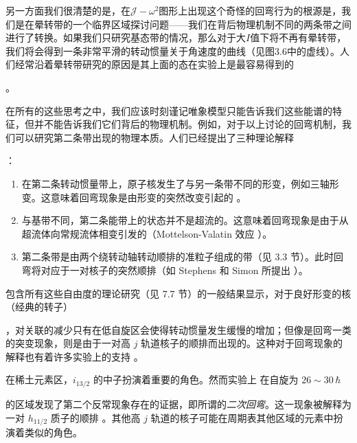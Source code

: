 另一方面我们很清楚的是，在$\mathcal{J}-\omega^{2}$图形上出现这个奇怪的回弯行为的根源是，我们是在晕转带的一个临界区域探讨问题——我们在背后物理机制不同的两条带之间进行了转换。如果我们只研究基态带的情况，那么对于大$I$值下将不再有晕转带，我们将会得到一条非常平滑的转动惯量关于角速度的曲线（见图3.6中的虚线）。人们经常沿着晕转带研究的原因是其上面的态在实验上是最容易得到的

。

在所有的这些思考之中，我们应该时刻谨记唯象模型只能告诉我们这些能谱的特征，但并不能告诉我们它们背后的物理机制。例如，对于以上讨论的回弯机制，我们可以研究第二条带出现的物理本质。人们已经提出了三种理论解释

：
\begin{enumerate}
\item 在第二条转动惯量带上，原子核发生了与另一条带不同的形变，例如三轴形变。这意味着回弯现象是由形变的突然改变引起的 \cite{Th73,SV73}。
\item 与基带不同，第二条能带上的状态并不是超流的。这意味着回弯现象是由于从超流体向常规流体相变引发的（Mottelson-Valatin
效应 \cite{MV60}）。
\item 第二条带是由两个绕转动轴转动顺排的准粒子组成的带（见 3.3 节）。此时回弯将对应于一对核子的突然顺排（如 Stephens 和 Simon
所提出 \cite{SS72a}）。
\end{enumerate}
包含所有这些自由度的理论研究（见 7.7 节）的一般结果显示，对于良好形变的核（经典的转子）

，对关联的减少只有在低自旋区会使得转动惯量发生缓慢的增加；但像是回弯一类的突变现象，则是由于一对高 $j$ 轨道核子的顺排而出现的。这种对于回弯现象的解释也有着许多实验上的支持
\cite{GSD73,RSS74,WBB75,SLM76,St76}。

在稀土元素区，$i_{13/2}$ 的中子扮演着重要的角色。然而实验上 \cite{LAD77,BBB79a} 在自旋为 $26\sim30\,\hbar$

的区域发现了第二个反常现象存在的证据，即所谓的\emph{二次回弯}。这一现象被解释为一对 $h_{11/2}$ 质子的顺排 \cite{FP78}。其他高
$j$ 轨道的核子可能在周期表其他区域的元素中扮演着类似的角色。

